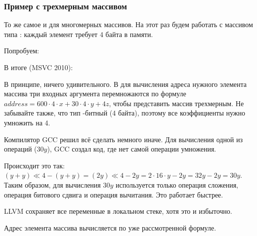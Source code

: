 \subsubsection{Пример с трехмерным массивом}

То же самое и для многомерных массивов.
На этот раз будем работать с массивом типа \Tint: каждый элемент требует 4 байта в памяти.

Попробуем:




В итоге (MSVC 2010):



В принципе, ничего удивительного. В  для вычисления адреса нужного элемента массива 
три входных аргумента перемножаются по формуле $address=600 \cdot 4 \cdot x + 30 \cdot 4 \cdot y + 4z$, 
чтобы представить массив трехмерным.
Не забывайте также, что тип -битный (4 байта), поэтому все коэффициенты нужно умножить на 4.



Компилятор GCC решил всё сделать немного иначе.
Для вычисления одной из операций ($30y$), GCC создал код, где нет самой операции умножения.

Происходит это так: 
$(y+y) \ll 4 - (y+y) = (2y) \ll 4 - 2y = 2 \cdot 16 \cdot y - 2y = 32y - 2y = 30y$. 
Таким образом, для вычисления $30y$ используется только операция сложения, 
операция битового сдвига и операция вычитания.
Это работает быстрее.




\NonOptimizing LLVM сохраняет все переменные в локальном стеке, хотя это и избыточно.

Адрес элемента массива вычисляется по уже рассмотренной формуле.




